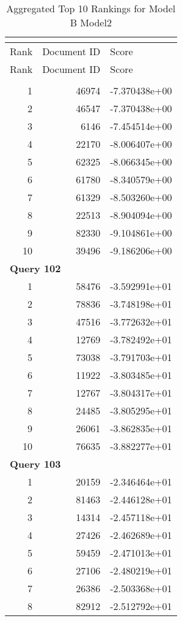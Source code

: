\begin{longtable}[{p}]{@{}rrp{}@{}}
\caption{Aggregated Top 10 Rankings for Model B Model2} {\label{tab:aggregated_BModel2}}\\
\toprule
Rank & Document ID & Score \\
\midrule
\endfirsthead
\toprule
Rank & Document ID & Score \\
\midrule
\endhead
\endfoot
\bottomrule
\endlastfoot
\multicolumn{3}{l}{\bfseries Query 101} \\
1 & 46974 & -7.370438e+00 \\
2 & 46547 & -7.370438e+00 \\
3 & 6146 & -7.454514e+00 \\
4 & 22170 & -8.006407e+00 \\
5 & 62325 & -8.066345e+00 \\
6 & 61780 & -8.340579e+00 \\
7 & 61329 & -8.503260e+00 \\
8 & 22513 & -8.904094e+00 \\
9 & 82330 & -9.104861e+00 \\
10 & 39496 & -9.186206e+00 \\
\midrule
\multicolumn{3}{l}{\bfseries Query 102} \\
1 & 58476 & -3.592991e+01 \\
2 & 78836 & -3.748198e+01 \\
3 & 47516 & -3.772632e+01 \\
4 & 12769 & -3.782492e+01 \\
5 & 73038 & -3.791703e+01 \\
6 & 11922 & -3.803485e+01 \\
7 & 12767 & -3.804317e+01 \\
8 & 24485 & -3.805295e+01 \\
9 & 26061 & -3.862835e+01 \\
10 & 76635 & -3.882277e+01 \\
\midrule
\multicolumn{3}{l}{\bfseries Query 103} \\
1 & 20159 & -2.346464e+01 \\
2 & 81463 & -2.446128e+01 \\
3 & 14314 & -2.457118e+01 \\
4 & 27426 & -2.462689e+01 \\
5 & 59459 & -2.471013e+01 \\
6 & 27106 & -2.480219e+01 \\
7 & 26386 & -2.503368e+01 \\
8 & 82912 & -2.512792e+01 \\

\end{longtable}
